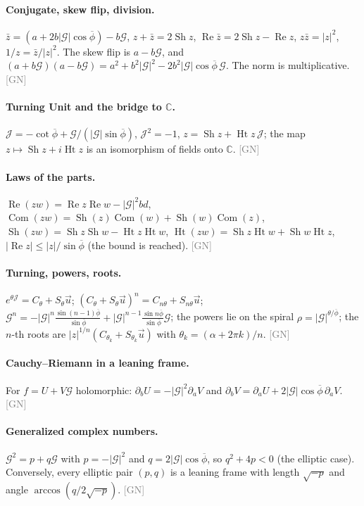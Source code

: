 \documentclass[11pt]{article}
\newcommand{\pb}{\overline{\phi}}
\newcommand{\Gp}{\mathcal{G}}
\newcommand{\G}{\lvert\Gp\rvert}
\renewcommand{\Re}{\operatorname{Re}}
\DeclareMathOperator{\Com}{Com}
\DeclareMathOperator{\Sh}{Sh}
\DeclareMathOperator{\Ht}{Ht}
\newcommand{\src}[1]{\hfill{\small\textcolor{gray}{[#1]}}}
\begin{document}
\paragraph{Conjugate, skew flip, division.}
$\bar z = (a+2b\G\cos\pb) - b\Gp$, $z+\bar z = 2\Sh z$, $\Re\bar z = 2\Sh z - \Re z$,
$z\bar z = \lvert z\rvert^2$, $1/z = \bar z/\lvert z\rvert^2$. The skew flip is $a - b\Gp$, and
$(a+b\Gp)(a-b\Gp) = a^2+b^2\G^2 - 2b^2\G\cos\pb\,\Gp$. The norm is multiplicative. \src{GN}

\paragraph{Turning Unit and the bridge to $\mathbb C$.}
$\mathcal J = -\cot\pb + \Gp/(\G\sin\pb)$, $\mathcal J^2 = -1$, $z = \Sh z + \Ht z\,\mathcal J$; the map
$z\mapsto\Sh z + i\Ht z$ is an isomorphism of fields onto $\mathbb C$. \src{GN}

\paragraph{Laws of the parts.}
$\Re(zw) = \Re z\Re w - \G^2bd$, $\Com(zw) = \Sh(z)\Com(w)+\Sh(w)\Com(z)$,
$\Sh(zw) = \Sh z\Sh w - \Ht z\Ht w$, $\Ht(zw) = \Sh z\Ht w + \Sh w\Ht z$,
$\lvert\Re z\rvert \le \lvert z\rvert/\sin\pb$ (the bound is reached). \src{GN}

\paragraph{Turning, powers, roots.}
$e^{\theta\mathcal J} = C_\theta + S_\theta\vec u$; $(C_\theta+S_\theta\vec u)^n = C_{n\theta}+S_{n\theta}\vec u$;
$\Gp^n = -\G^n\frac{\sin(n-1)\pb}{\sin\pb} + \G^{n-1}\frac{\sin n\pb}{\sin\pb}\Gp$;
the powers lie on the spiral $\rho = \G^{\theta/\pb}$; the $n$-th roots are $\lvert z\rvert^{1/n}(C_{\theta_k}+S_{\theta_k}\vec u)$
with $\theta_k = (\alpha+2\pi k)/n$. \src{GN}

\paragraph{Cauchy--Riemann in a leaning frame.} For $f = U+V\Gp$ holomorphic:
$\partial_bU = -\G^2\partial_aV$ and $\partial_bV = \partial_aU + 2\G\cos\pb\,\partial_aV$. \src{GN}

\paragraph{Generalized complex numbers.} $\Gp^2 = p+q\Gp$ with $p = -\G^2$ and $q = 2\G\cos\pb$, so $q^2+4p<0$ (the elliptic case).
Conversely, every elliptic pair $(p,q)$ is a leaning frame with length $\sqrt{-p}$ and angle $\arccos(q/2\sqrt{-p})$. \src{GN}
\end{document}
